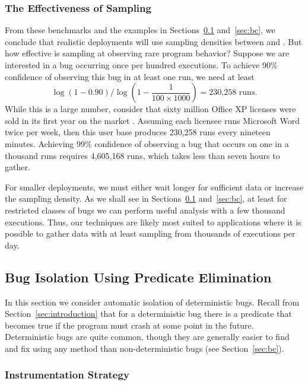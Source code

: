 \subsubsection{The Effectiveness of Sampling}

From these benchmarks and the examples in Sections~\ref{sec:ccrypt}
and~\ref{sec:bc}, we conclude that realistic deployments will use
sampling densities between  and .
But how effective is  sampling at observing rare
program behavior?  Suppose we are interested in a bug occurring once
per hundred executions.  To achieve 90\% confidence of observing this
bug in at least one run, we need at least
\[\log{(1-0.90)} / \log{\left( 1 - \frac{1}{100 \times 1000}\right)} = \text{230,258 runs.}\]
While this is a large number, consider that sixty million Office XP
licenses were sold in its first year on the market
\cite{Microsoft:2002:AR-F10K}.  Assuming each licensee runs Microsoft
Word twice per week, then this user base produces 230,258 runs every
nineteen minutes.  Achieving 99\% confidence of observing a 
bug that occurs on one in a thousand runs requires 4,605,168 runs, 
which takes less than seven hours to gather.  

For smaller deployments, we must either wait longer for sufficient
data or increase the sampling density.  As we shall see in
Sections~\ref{sec:ccrypt} and~\ref{sec:bc}, at least for restricted
classes of bugs we can perform useful analysis with a few thousand
executions.  Thus, our techniques are likely most suited to
applications where it is possible to gather data with at least   sampling from thousands of executions per day.


\subsection{Bug Isolation Using Predicate Elimination}
\label{sec:ccrypt}

In this section we consider automatic isolation of deterministic
bugs.  Recall from Section~\ref{sec:introduction} that for a deterministic
bug there is a predicate that becomes true
if the program must crash at some point in the future.
Deterministic bugs are quite common, though they are generally easier
to find and fix using any method than non-deterministic bugs (see
Section~\ref{sec:bc}).

\subsubsection{Instrumentation Strategy}

